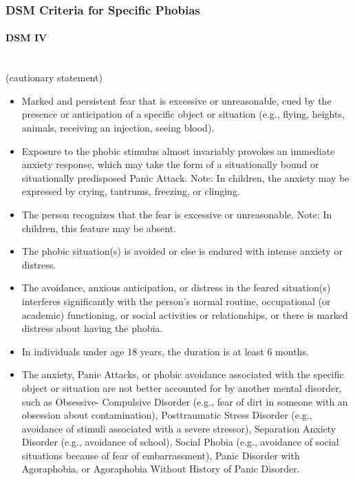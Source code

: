 \documentclass[a4paper,10pt]{article}
\begin{document}
\subsubsection{DSM Criteria for Specific Phobias}
\paragraph{DSM IV}~\\
(cautionary statement) 
\begin{itemize}
 \item Marked and persistent fear that is excessive or unreasonable, cued by the presence or anticipation of a specific object or situation (e.g., flying, heights, animals, receiving an
 injection, seeing blood). 
 \item Exposure to the phobic stimulus almost invariably provokes an immediate anxiety response, which may take the form of a situationally bound or situationally predisposed Panic Attack. 
 Note: In children, the anxiety may be expressed by crying, tantrums, freezing, or clinging. 
\item  The person recognizes that the fear is excessive or unreasonable. Note: In children, this feature may be absent. 
\item The phobic situation(s) is avoided or else is endured with intense anxiety or distress. 
\item The avoidance, anxious anticipation, or distress in the feared situation(s) interferes significantly with the person's normal routine, occupational (or academic) functioning, or
social activities or relationships, or there is marked distress about having the phobia. 
\item In individuals under age 18 years, the duration is at least 6 months.
\item The anxiety, Panic Attacks, or phobic avoidance associated with the specific object or situation are not better accounted for by another mental disorder, such as Obsessive-
Compulsive Disorder (e.g., fear of dirt in someone with an obsession about contamination), Posttraumatic Stress Disorder (e.g., avoidance of stimuli associated with a severe stressor),
Separation Anxiety Disorder (e.g., avoidance of school), Social Phobia (e.g., avoidance of social situations because of fear of embarrassment), Panic Disorder with Agoraphobia, or 
Agoraphobia Without History of Panic Disorder. \cite{dsmPhobia}
\end{itemize}
 
\end{document}
